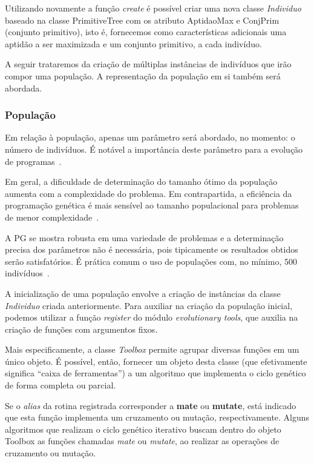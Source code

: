 Utilizando novamente a função \textit{create} é possível criar uma nova classe \textit{Individuo} baseado na classe PrimitiveTree com os atributo AptidaoMax e ConjPrim (conjunto primitivo), isto é, fornecemos como características adicionais uma aptidão a ser maximizada e um conjunto primitivo, a cada indivíduo.

A seguir trataremos da criação de múltiplas instâncias de indivíduos que irão compor uma população. A representação da população em si também será abordada.

\subsubsection{População}\label{sssec:3deap-populacao}

Em relação à população, apenas um parâmetro será abordado, no momento: o número de indivíduos. É notável a importância deste parâmetro para a evolução de programas~\cite{koza92bookGp}.

Em geral, a dificuldade de determinação do tamanho ótimo da população aumenta com a complexidade do problema. Em contrapartida, a eficiência da programação genética é mais sensível ao tamanho populacional para problemas de menor complexidade~\cite{alan06PopSize}.

A PG se mostra robusta em uma variedade de problemas e a determinação precisa dos parâmetros não é necessária, pois tipicamente os resultados obtidos serão satisfatórios. É prática comum o uso de populações com, no mínimo, 500 indivíduos~\cite{poli08GpFieldGuide}.

A inicialização de uma população envolve a criação de instâncias da classe \textit{Individuo} criada anteriormente. Para auxiliar na criação da população inicial, podemos utilizar a função \textit{register} do módulo \textit{evolutionary tools}, que auxilia na criação de funções com argumentos fixos.

Mais especificamente, a classe \textit{Toolbox} permite agrupar diversas funções em um único objeto. É possível, então, fornecer um objeto desta classe (que efetivamente significa ``caixa de ferramentas'') a um algoritmo que implementa o ciclo genético de forma completa ou parcial.


Se o \textit{alias} da rotina registrada corresponder a \textbf{mate} ou \textbf{mutate}, está indicado que esta função implementa um cruzamento ou mutação, respectivamente. Alguns algoritmos que realizam o ciclo genético iterativo buscam dentro do objeto Toolbox as funções chamadas \textit{mate} ou \textit{mutate}, ao realizar as operações de cruzamento ou mutação.

